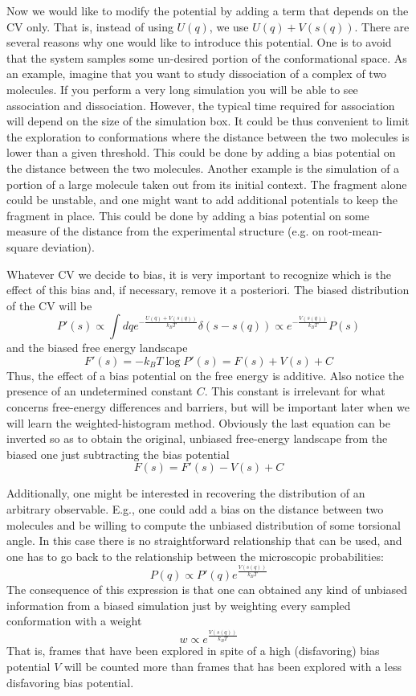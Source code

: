 Now we would like to modify the potential by adding a term that depends on the C\+V only. That is, instead of using $ U(q) $, we use $ U(q)+V(s(q))$. There are several reasons why one would like to introduce this potential. One is to avoid that the system samples some un-\/desired portion of the conformational space. As an example, imagine that you want to study dissociation of a complex of two molecules. If you perform a very long simulation you will be able to see association and dissociation. However, the typical time required for association will depend on the size of the simulation box. It could be thus convenient to limit the exploration to conformations where the distance between the two molecules is lower than a given threshold. This could be done by adding a bias potential on the distance between the two molecules. Another example is the simulation of a portion of a large molecule taken out from its initial context. The fragment alone could be unstable, and one might want to add additional potentials to keep the fragment in place. This could be done by adding a bias potential on some measure of the distance from the experimental structure (e.\+g. on root-\/mean-\/square deviation).

Whatever C\+V we decide to bias, it is very important to recognize which is the effect of this bias and, if necessary, remove it a posteriori. The biased distribution of the C\+V will be \[ P'(s)\propto \int dq e^{-\frac{U(q)+V(s(q))}{k_BT}} \delta(s-s(q))\propto e^{-\frac{V(s(q))}{k_BT}}P(s) \] and the biased free energy landscape \[ F'(s)=-k_B T \log P'(s)=F(s)+V(s)+C \] Thus, the effect of a bias potential on the free energy is additive. Also notice the presence of an undetermined constant $ C $. This constant is irrelevant for what concerns free-\/energy differences and barriers, but will be important later when we will learn the weighted-\/histogram method. Obviously the last equation can be inverted so as to obtain the original, unbiased free-\/energy landscape from the biased one just subtracting the bias potential \[ F(s)=F'(s)-V(s)+C \]

Additionally, one might be interested in recovering the distribution of an arbitrary observable. E.\+g., one could add a bias on the distance between two molecules and be willing to compute the unbiased distribution of some torsional angle. In this case there is no straightforward relationship that can be used, and one has to go back to the relationship between the microscopic probabilities\+: \[ P(q)\propto P'(q) e^{\frac{V(s(q))}{k_BT}} \] The consequence of this expression is that one can obtained any kind of unbiased information from a biased simulation just by weighting every sampled conformation with a weight \[ w\propto e^{\frac{V(s(q))}{k_BT}} \] That is, frames that have been explored in spite of a high (disfavoring) bias potential $ V $ will be counted more than frames that has been explored with a less disfavoring bias potential.



